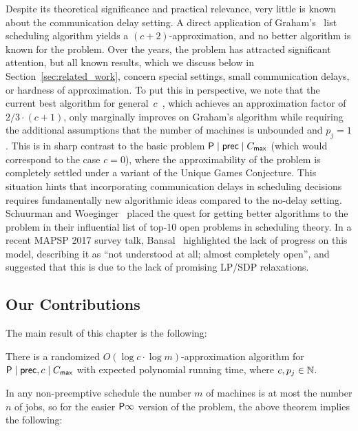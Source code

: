 Despite its theoretical significance and practical relevance, very little is known about the communication delay setting.
A direct application of Graham's~\cite{GrahamListScheduling1966} list scheduling algorithm yields a $(c+2)$-approximation,
and no better algorithm is known for the problem.
Over the years, the problem has attracted significant attention, but all known results,
which we discuss below in Section~\ref{sec:related_work}, concern special settings, small communication delays, or hardness of approximation. 
To put this in perspective, we note that the current best algorithm for general~$c$~\cite{GiroudeauKMP08}, which achieves an approximation factor of $2/3 \cdot (c+1)$, only marginally improves on Graham's algorithm while requiring the additional assumptions that the number of machines is unbounded and $p_j = 1$.
This is in sharp contrast to the basic problem  $\mathsf{P} \mid \mathsf{prec} \mid C_{\mathsf{max}}$ (which would correspond to the case $c=0$), where the approximability of the problem is completely settled under a variant of the Unique Games Conjecture.
This situation hints that incorporating communication delays in scheduling  decisions requires fundamentally new algorithmic ideas compared to the no-delay setting.
Schuurman and Woeginger~\cite{SW99a} placed the quest for getting better algorithms to the problem in their influential list of top-10 open problems in scheduling theory.
In a recent MAPSP 2017 survey talk,  Bansal~\cite{Bansalmapsp} highlighted the lack of progress on this model, describing it as ``not understood at all; almost completely open'', and suggested that this is due to the lack of promising LP/SDP relaxations.


\subsection{Our Contributions}

The main result of this chapter is the following:

\begin{theorem} \label{thm:main_sched1}
There is a randomized $O(\log c \cdot \log m)$-approximation algorithm for $\mathsf{P} \mid \mathsf{prec}, c \mid C_{\mathsf{max}}$ with expected polynomial running time, where $c, p_j \in \mathbb{N}$.
\end{theorem}

In any non-preemptive schedule the number $m$ of machines is at most the number $n$ of jobs, so for the easier $\mathsf{P} \infty$ version of the problem, the above theorem implies the following:

